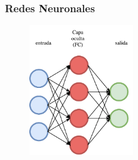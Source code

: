 \documentclass{beamer}
\begin{document}
\begin{frame}
\frametitle{Redes Neuronales}
\begin{figure}
    \centering
    \includegraphics[width=0.4\textwidth]{images/neural-net.pdf}
\end{figure}
\end{frame}
\end{document}
